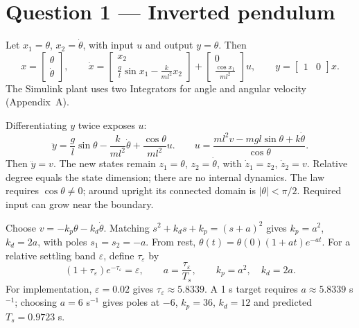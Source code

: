 \section*{Question 1 --- Inverted pendulum}
Let $x_1=\theta$, $x_2=\dot\theta$, with input $u$ and output $y=\theta$. Then
\begin{equation}
 x=\begin{bmatrix}\theta\\\dot\theta\end{bmatrix},\qquad
 \boxed{\dot x=
 \begin{bmatrix}x_2\\\frac{g}{l}\sin x_1-\frac{k}{ml^2}x_2\end{bmatrix}
 +\begin{bmatrix}0\\\frac{\cos x_1}{ml^2}\end{bmatrix}u},\qquad
 y=\begin{bmatrix}1&0\end{bmatrix}x.
\end{equation}
The Simulink plant uses two Integrators for angle and angular velocity (Appendix~A).

Differentiating $y$ twice exposes $u$:
\begin{equation}
 \ddot y=\frac{g}{l}\sin\theta-\frac{k}{ml^2}\dot\theta+\frac{\cos\theta}{ml^2}u.
 \qquad
 \boxed{u=\frac{ml^2v-mgl\sin\theta+k\dot\theta}{\cos\theta}.}
\end{equation}
Then $\ddot y=v$. The new states remain $z_1=\theta$, $z_2=\dot\theta$, with $\dot z_1=z_2$, $\dot z_2=v$. Relative degree equals the state dimension; there are no internal dynamics. The law requires $\cos\theta\ne0$; around upright its connected domain is $|\theta|<\pi/2$. Required input can grow near the boundary.

Choose $v=-k_p\theta-k_d\dot\theta$. Matching $s^2+k_ds+k_p=(s+a)^2$ gives $k_p=a^2$, $k_d=2a$, with poles $s_1=s_2=-a$. From rest, $\theta(t)=\theta(0)(1+at)e^{-at}$. For a relative settling band $\varepsilon$, define $\tau_\varepsilon$ by
\begin{equation}
(1+\tau_\varepsilon)e^{-\tau_\varepsilon}=\varepsilon,
\qquad a=\frac{\tau_\varepsilon}{T_s},\qquad
\boxed{k_p=a^2,\quad k_d=2a.}
\end{equation}
For implementation, $\varepsilon=0.02$ gives $\tau_\varepsilon\approx5.8339$. A 1 s target requires $a\approx5.8339$ s$^{-1}$; choosing $a=6$ s$^{-1}$ gives poles at $-6$, $k_p=36$, $k_d=12$ and predicted $T_s=0.9723$ s.

